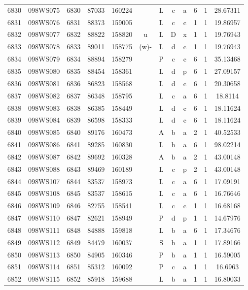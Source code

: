 \begin{tabular}{|*{12}{c|}}
6830 & 098WS075 & 6830 & 87033 & 160224 &  & L & c & a & 6 & 1 & 28.67311 \\ 
6831 & 098WS076 & 6831 & 88373 & 159005 &  & L & c & c & 1 & 1 & 19.86957 \\ 
6832 & 098WS077 & 6832 & 88822 & 158820 & u & L & D & x & 1 & 1 & 19.76943 \\ 
6833 & 098WS078 & 6833 & 89011 & 158775 & (w)- & L & d & c & 1 & 1 & 19.76943 \\ 
6834 & 098WS079 & 6834 & 88894 & 158279 &  & P & c & c & 6 & 1 & 35.13468 \\ 
6835 & 098WS080 & 6835 & 88454 & 158361 &  & L & d & p & 6 & 1 & 27.09157 \\ 
6836 & 098WS081 & 6836 & 86823 & 158568 &  & L & d & c & 6 & 1 & 20.30658 \\ 
6837 & 098WS082 & 6837 & 86348 & 158795 &  & L & c & a & 6 & 1 & 18.8114 \\ 
6838 & 098WS083 & 6838 & 86385 & 158449 &  & L & d & c & 6 & 1 & 18.11624 \\ 
6839 & 098WS084 & 6839 & 86598 & 158333 &  & L & d & c & 6 & 1 & 18.11624 \\ 
6840 & 098WS085 & 6840 & 89176 & 160473 &  & A & b & a & 2 & 1 & 40.52533 \\ 
6841 & 098WS086 & 6841 & 89285 & 160830 &  & L & b & a & 6 & 1 & 98.02214 \\ 
6842 & 098WS087 & 6842 & 89692 & 160328 &  & A & b & a & 2 & 1 & 43.00148 \\ 
6843 & 098WS088 & 6843 & 89469 & 160189 &  & L & c & p & 2 & 1 & 43.00148 \\ 
6844 & 098WS107 & 6844 & 83537 & 158973 &  & L & c & a & 6 & 1 & 17.09191 \\ 
6845 & 098WS108 & 6845 & 83537 & 158615 &  & L & c & a & 6 & 1 & 16.76646 \\ 
6846 & 098WS109 & 6846 & 82755 & 158541 &  & L & c & c & 1 & 1 & 16.68168 \\ 
6847 & 098WS110 & 6847 & 82621 & 158949 &  & P & d & p & 1 & 1 & 14.67976 \\ 
6848 & 098WS111 & 6848 & 84888 & 159818 &  & L & b & a & 6 & 1 & 17.34676 \\ 
6849 & 098WS112 & 6849 & 84479 & 160037 &  & S & b & a & 1 & 1 & 17.89166 \\ 
6850 & 098WS113 & 6850 & 84905 & 160346 &  & P & b & a & 1 & 1 & 16.59005 \\ 
6851 & 098WS114 & 6851 & 85312 & 160092 &  & P & c & a & 1 & 1 & 16.6963 \\ 
6852 & 098WS115 & 6852 & 85918 & 159688 &  & L & b & a & 1 & 1 & 16.80033 \\ 

\end{tabular}
